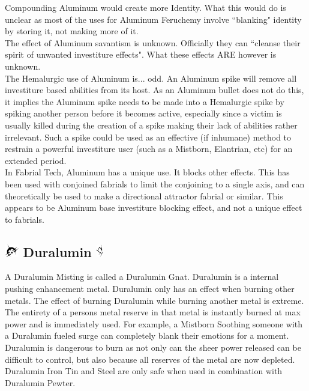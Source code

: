 \documentclass[conference]{IEEEtran}
\begin{document}
Compounding Aluminum would create more Identity.  What this would do is unclear as most of the uses for Aluminum Feruchemy involve ``blanking" identity by storing it, not making more of it.  \\

The effect of Aluminum savantism is unknown.  Officially they can ``cleanse their spirit of unwanted investiture effects".\cite{al-savant}  What these effects ARE however is unknown. \\

The Hemalurgic use of Aluminum is... odd.  An Aluminum spike will remove all investiture based abilities from its host.\cite{HE-TB}  As an Aluminum bullet does not do this, it implies the Aluminum spike needs to be made into a Hemalurgic spike by spiking another person before it becomes active, especially since a victim is usually killed during the creation of a spike making their lack of abilities rather irrelevant.  Such a spike could be used as an effective (if inhumane) method to restrain a powerful investiture user (such as a Mistborn, Elantrian, etc) for an extended period.\\  

In Fabrial Tech, Aluminum has a unique use.  It blocks other effects.  This has been used with conjoined fabrials to limit the conjoining to a single axis,\cite{RoW-CH19} and can theoretically be used to make a directional attractor fabrial or similar.  This appears to be Aluminum base investiture blocking effect, and not a unique effect to fabrials.

\subsection*{\includegraphics[height=1em]{images/Duralumin.png}  Duralumin \includegraphics[height=1em]{images/Duralumin_(Feruchemy).png}}
A Duralumin Misting is called a Duralumin Gnat.\cite{ARS}  Duralumin is a internal pushing enhancement metal.\cite{AL-TB}  Duralumin only has an effect when burning other metals.  The effect of burning Duralumin while burning another metal is extreme. The entirety of a persons metal reserve in that metal is instantly burned at max power and is immediately used.\cite{ARS}   For example, a Mistborn Soothing someone with a Duralumin fueled surge can completely blank their emotions for a moment.\cite{WoA-ch27}  Duralumin is dangerous to burn as not only can the sheer power released can be difficult to control,\cite{WoA-CH11} but also because all reserves of the metal are now depleted.\cite{WoA-CH38}  Duralumin Iron Tin and Steel are only safe when used in combination with Duralumin Pewter.\cite{WoA-CH11}
\end{document}
